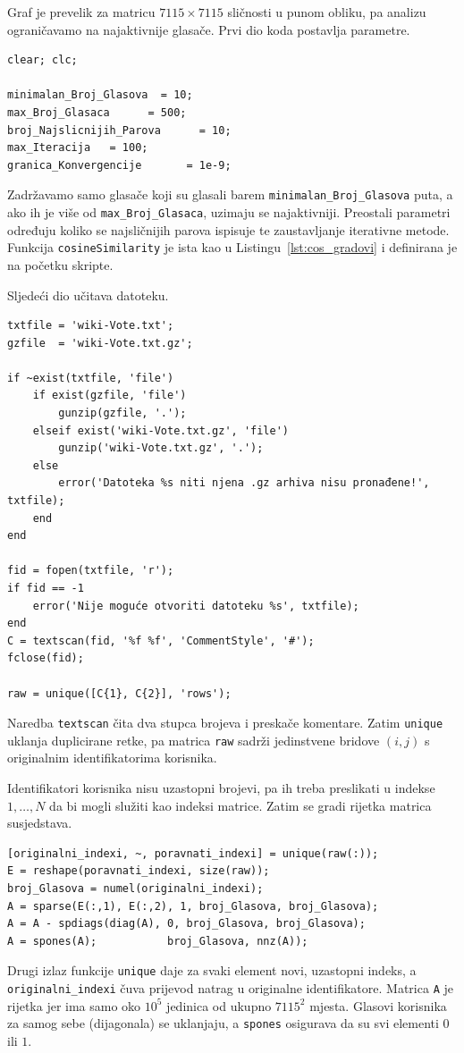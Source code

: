 \documentclass[12pt, letterpaper]{article}
\numberwithin{figure}{section}
\begin{document}
Graf je prevelik za matricu $7115\times 7115 $ sličnosti u punom obliku, pa analizu ograničavamo na najaktivnije glasače. Prvi dio koda postavlja parametre.

\begin{lstlisting}[style=octave, caption={Parametri analize}, label={lst:wiki_parametri}]
clear; clc;

minimalan_Broj_Glasova  = 10;    
max_Broj_Glasaca      = 500;     
broj_Najslicnijih_Parova      = 10;      
max_Iteracija   = 100;     
granica_Konvergencije       = 1e-9;
\end{lstlisting}
Zadržavamo samo glasače koji su glasali barem \texttt{minimalan\_Broj\_Glasova} puta, a ako ih je više od \texttt{max\_Broj\_Glasaca}, uzimaju se najaktivniji. Preostali parametri određuju koliko se najsličnijih parova ispisuje te zaustavljanje iterativne metode. Funkcija \texttt{cosineSimilarity} je ista kao u Listingu~\ref{lst:cos_gradovi} i definirana je na početku skripte.

Sljedeći dio učitava datoteku. 

\begin{lstlisting}[style=octave, caption={Učitavanje podataka}, label={lst:wiki_ucitavanje}]
txtfile = 'wiki-Vote.txt';
gzfile  = 'wiki-Vote.txt.gz'; 

if ~exist(txtfile, 'file')
    if exist(gzfile, 'file')
        gunzip(gzfile, '.');
    elseif exist('wiki-Vote.txt.gz', 'file')
        gunzip('wiki-Vote.txt.gz', '.');
    else
        error('Datoteka %s niti njena .gz arhiva nisu pronađene!', txtfile);
    end
end

fid = fopen(txtfile, 'r');
if fid == -1
    error('Nije moguće otvoriti datoteku %s', txtfile);
end
C = textscan(fid, '%f %f', 'CommentStyle', '#');
fclose(fid);

raw = unique([C{1}, C{2}], 'rows');         
\end{lstlisting}
Naredba \texttt{textscan} čita dva stupca brojeva i preskače komentare. Zatim \texttt{unique} uklanja duplicirane retke, pa matrica \texttt{raw} sadrži jedinstvene bridove $(i,j)$ s originalnim identifikatorima korisnika.

Identifikatori korisnika nisu uzastopni brojevi, pa ih treba preslikati u indekse $1,\dots,N$ da bi mogli služiti kao indeksi matrice. Zatim se gradi rijetka matrica susjedstava.

\begin{lstlisting}[style=octave, caption={Izgradnja matrice susjedstava}, label={lst:wiki_matrica}]
[originalni_indexi, ~, poravnati_indexi] = unique(raw(:));         
E = reshape(poravnati_indexi, size(raw));
broj_Glasova = numel(originalni_indexi);
A = sparse(E(:,1), E(:,2), 1, broj_Glasova, broj_Glasova);         
A = A - spdiags(diag(A), 0, broj_Glasova, broj_Glasova);          
A = spones(A);           broj_Glasova, nnz(A));
\end{lstlisting}
Drugi izlaz funkcije \texttt{unique} daje za svaki element novi, uzastopni indeks, a \texttt{originalni\_indexi} čuva prijevod natrag u originalne identifikatore. Matrica \texttt{A} je rijetka jer ima samo oko $10^5$ jedinica od ukupno $7115^2$ mjesta. Glasovi korisnika za samog sebe (dijagonala) se uklanjaju, a \texttt{spones} osigurava da su svi elementi $0$ ili $1$.
\end{document}

